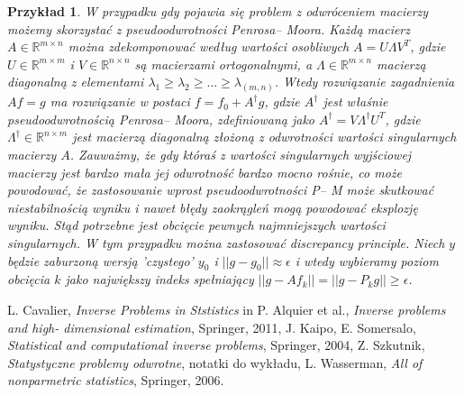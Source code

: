 \documentclass[12pt]{article}
\newtheorem{prz}{Przykład}
\begin{document}
\begin{prz}
W przypadku gdy pojawia się problem z odwróceniem macierzy możemy skorzystać z pseudoodwrotności Penrosa-- Moora. Każdą macierz $A\in \mathbb{R}^{m\times n}$ można zdekomponować według wartości osobliwych $A=U\Lambda V^T$, gdzie $U\in \mathbb{R}^{m\times m}$ i $V\in \mathbb{R}^{n\times n}$ są macierzami ortogonalnymi, a $\Lambda\in \mathbb{R}^{m\times n}$ macierzą diagonalną z elementami $\lambda_1\geq \lambda_2\geq \dots\geq \lambda_{(m,n)}$. Wtedy rozwiązanie zagadnienia $Af=g$ ma rozwiązanie w postaci $f=f_0+A^{\dagger}g$, gdzie $A^{\dagger}$ jest właśnie pseudoodwrotnością Penrosa-- Moora, zdefiniowaną jako $ A^{\dagger}=V\Lambda^{\dagger}U^T$, gdzie $\Lambda^{\dagger}\in \mathbb{R}^{n\times m}$ jest macierzą diagonalną złożoną z odwrotności wartości singularnych macierzy $A$. Zauważmy, że gdy któraś z wartości singularnych wyjściowej macierzy jest bardzo mała jej odwrotność bardzo mocno rośnie, co może powodować, że zastosowanie wprost pseudoodwrotności P-- M może skutkować niestabilnością wyniku i nawet błędy zaokrągleń mogą powodować eksplozję wyniku. Stąd potrzebne jest obcięcie pewnych najmniejszych wartości singularnych. W tym przypadku można zastosować discrepancy principle. Niech $y$ będzie zaburzoną wersją 'czystego' $y_0$ i $||g-g_0||\approx\epsilon$ i wtedy wybieramy poziom obcięcia $k$ jako największy indeks spełniający $||g-Af_k||=||g-P_kg||\geq \epsilon$.\\
\end{prz}
\begin{thebibliography}{4}
L. Cavalier, \emph{Inverse Problems in Ststistics} in P. Alquier et al., \emph{Inverse problems and high- dimensional estimation}, Springer, 2011,
J. Kaipo, E. Somersalo, \emph{Statistical and computational inverse problems}, Springer, 2004,
Z. Szkutnik, \emph{Statystyczne problemy odwrotne}, notatki do wykładu,
L. Wasserman, \emph{All of nonparmetric statistics}, Springer, 2006.
\end{thebibliography}
\end{document}
